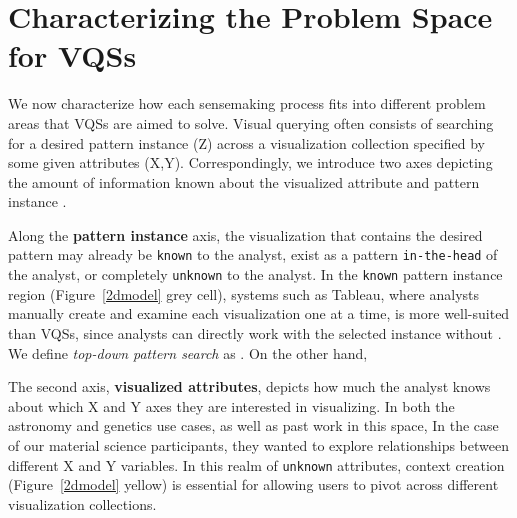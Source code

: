 \section{Characterizing the Problem Space for VQSs}
We now characterize how each sensemaking process fits into different problem areas that VQSs are aimed to solve. Visual querying often consists of searching for a desired pattern instance (Z) across a visualization collection specified by some given attributes (X,Y). Correspondingly, we introduce two axes depicting the amount of information known about the visualized attribute and pattern instance .
\par Along the \textbf{pattern instance} axis, the visualization that contains the desired pattern may already be \texttt{known} to the analyst, exist as a pattern \texttt{in-the-head} of the analyst, or  completely \texttt{unknown} to the analyst. In the \texttt{known} pattern instance region (Figure~\ref{2dmodel} grey cell), systems such as Tableau, where analysts manually create and examine each visualization one at a time, is more well-suited than VQSs, since analysts can directly work with the selected instance without . We define \textit{top-down pattern search} as . On the other hand,  
\par The second axis, \textbf{visualized attributes},
depicts how much the analyst
knows about which X and Y axes
they are interested in visualizing.
In both the astronomy and genetics use cases,
as well as past work in this space,  In the case of our material science participants, they wanted to explore relationships between different
X and Y variables. In this realm of \texttt{unknown} attributes, context creation (Figure~\ref{2dmodel} yellow) is
essential for allowing users to pivot across different visualization collections.
